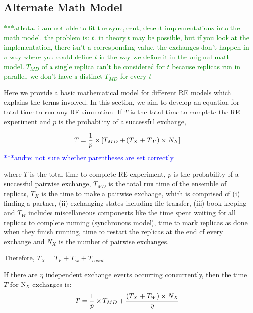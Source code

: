 \documentclass{rspublic}
\newcommand{\alnote}[1]{ {\textcolor{blue} { ***andre: #1 }}}
\newcommand{\athotanote}[1]{ {\textcolor{green} { ***athota: #1 }}}
\newcommand{\alnote}[1]{}
\newcommand{\athotanote}[1]{}
\begin{document}


\subsection{Alternate Math Model}
\athotanote{i am not able to fit the sync, cent, decent
  implementations into the math model. the problem is: $t$. in theory
  $t$ may be possible, but if you look at the implementation, there
  isn't a corresponding value. the exchanges don't happen in a way
  where you could define $t$ in the way we define it in the original
  math model. $T_{MD}$ of a single replica can't be considered for $t$
  because replicas run in parallel, we don't have a distinct $T_{MD}$
  for every $t$. }

Here we provide a basic mathematical model for different RE
models which explains the terms involved. In this section, we aim to
develop an equation for total time to run any RE simulation. If $T$ is
the total time to complete the RE experiment and $p$ is the
probability of a successful exchange,

\begin{eqnarray}
T = {1\over p} \times [T_{MD}+ (T_{X} + T_{W}) \times N_X]
\label{eq:totaltime}
\end{eqnarray}
\alnote{not sure whether parentheses are set correctly}


where $T$ is the total time to complete RE experiment, $p$ is the probability of a successful pairwise exchange, $T_{MD}$ is the total run time of the ensemble of replicas, $T_{X}$ is the time to make a pairwise exchange, which is comprised of (i) finding a partner, (ii) exchanging
states including file transfer, (iii) book-keeping and $T_{W}$ includes miscellaneous components like the time spent waiting for all replicas to complete running (synchronous model), time to mark replicas as done when they finish running, time to restart the replicas at the end of every exchange and $N_X$ is the number of pairwise exchanges.

Therefore, ${T_{X}} = {T_F + T_{ex} + T_{coord}}$ 

If there are $\eta$ independent exchange events occurring concurrently, then the time $T$ for 
N$_X$ exchanges is:
\begin{eqnarray}
T = {1\over p} \times T_{MD}+ {(T_{X} + T_{W}) \times N_X\over \eta}
\label{eq:totaltime}
\end{eqnarray}
\end{document}
